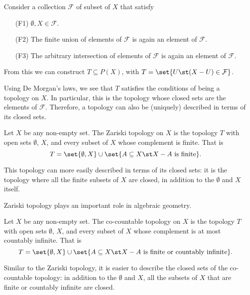 Consider a collection $\mathcal{F}$ of subset of $X$ that satisfy
\begin{enumerate}[leftmargin=15mm]
\item[(F1)] $\emptyset, X \in \mathcal{F}$.
\item[(F2)] The finite union of elements of $\mathcal{F}$ is again an element of $\mathcal{F}$.
\item[(F3)] The arbitrary intersection of elements of $\mathcal{F}$ is again an element of $\mathcal{F}$.
\end{enumerate}
From this we can construct $T \subseteq P(X)$, with $T=\set{U \st (X-U) \in \mathcal{F}}$.

Using De Morgan's laws, we see that $T$ satisfies the conditions of being a topology on $X$. In particular, this is the topology whose closed sets are the elements of $\mathcal{F}$. Therefore, a topology can also be (uniquely) described in terms of its closed sets.

\begin{negg}
  Let $X$ be any non-empty set. The Zariski topology on $X$ is the topology $T$ with open sets $\emptyset$, $X$, and every subset of $X$ whose complement is finite. That is
  \begin{equation*}
    T = \set{\emptyset, X} \cup \set{A \subseteq X \st X-A\ \text{is finite}}.
  \end{equation*}

  This topology can more easily described in terms of its closed sets: it is the topology where all the finite subsets of $X$ are closed, in addition to the $\emptyset$ and $X$ itself.

  Zariski topology plays an important role in algebraic geometry.\eggqed
\end{negg}

\begin{negg}
  Let $X$ be any non-empty set. The co-countable topology on $X$ is the topology $T$ with open sets $\emptyset$, $X$, and every subset of $X$ whose complement is at most countably infinite. That is
  \begin{equation*}
    T = \set{\emptyset, X} \cup \set{A \subseteq X \st X-A\ \text{is finite or countably infinite}}.
  \end{equation*}

  Similar to the Zariski topology, it is easier to describe the closed sets of the co-countable topology: in addition to the $\emptyset$ and $X$, all the subsets of $X$ that are finite or countably infinite are closed.\eggqed
\end{negg}

